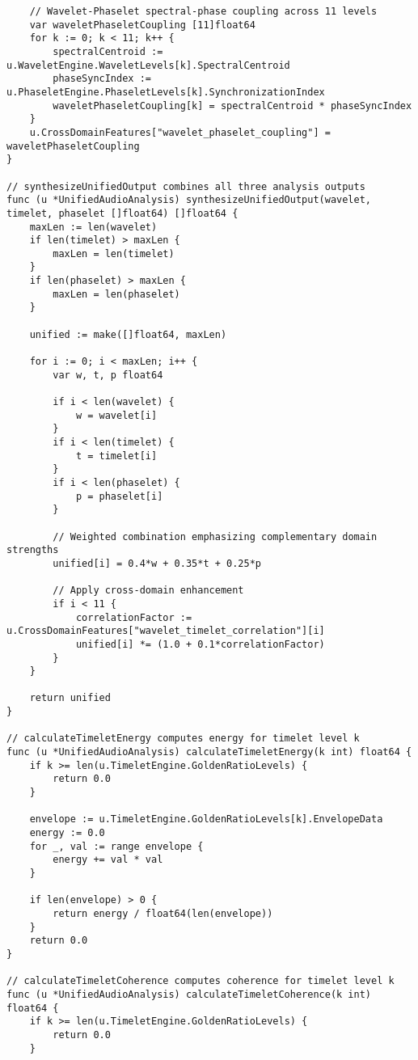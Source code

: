 \begin{tcolorbox}[colback=CodeBackground, colframe=DarkGray, title=Unified 11-Level Audio Analysis Framework, fonttitle=\bfseries]
\begin{verbatim}
    // Wavelet-Phaselet spectral-phase coupling across 11 levels
    var waveletPhaseletCoupling [11]float64
    for k := 0; k < 11; k++ {
        spectralCentroid := u.WaveletEngine.WaveletLevels[k].SpectralCentroid
        phaseSyncIndex := u.PhaseletEngine.PhaseletLevels[k].SynchronizationIndex
        waveletPhaseletCoupling[k] = spectralCentroid * phaseSyncIndex
    }
    u.CrossDomainFeatures["wavelet_phaselet_coupling"] = waveletPhaseletCoupling
}

// synthesizeUnifiedOutput combines all three analysis outputs
func (u *UnifiedAudioAnalysis) synthesizeUnifiedOutput(wavelet, timelet, phaselet []float64) []float64 {
    maxLen := len(wavelet)
    if len(timelet) > maxLen {
        maxLen = len(timelet)
    }
    if len(phaselet) > maxLen {
        maxLen = len(phaselet)
    }
    
    unified := make([]float64, maxLen)
    
    for i := 0; i < maxLen; i++ {
        var w, t, p float64
        
        if i < len(wavelet) {
            w = wavelet[i]
        }
        if i < len(timelet) {
            t = timelet[i]
        }
        if i < len(phaselet) {
            p = phaselet[i]
        }
        
        // Weighted combination emphasizing complementary domain strengths
        unified[i] = 0.4*w + 0.35*t + 0.25*p
        
        // Apply cross-domain enhancement
        if i < 11 {
            correlationFactor := u.CrossDomainFeatures["wavelet_timelet_correlation"][i]
            unified[i] *= (1.0 + 0.1*correlationFactor)
        }
    }
    
    return unified
}

// calculateTimeletEnergy computes energy for timelet level k
func (u *UnifiedAudioAnalysis) calculateTimeletEnergy(k int) float64 {
    if k >= len(u.TimeletEngine.GoldenRatioLevels) {
        return 0.0
    }
    
    envelope := u.TimeletEngine.GoldenRatioLevels[k].EnvelopeData
    energy := 0.0
    for _, val := range envelope {
        energy += val * val
    }
    
    if len(envelope) > 0 {
        return energy / float64(len(envelope))
    }
    return 0.0
}

// calculateTimeletCoherence computes coherence for timelet level k
func (u *UnifiedAudioAnalysis) calculateTimeletCoherence(k int) float64 {
    if k >= len(u.TimeletEngine.GoldenRatioLevels) {
        return 0.0
    }
    

\end{verbatim}
\end{tcolorbox}

